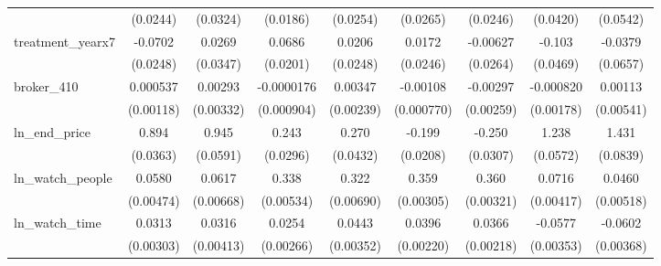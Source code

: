 {\begin{adjustbox}{max width=\textwidth}
\begin{tabular}{l*{8}{c}}
            &    (0.0244)         &    (0.0324)         &    (0.0186)         &    (0.0254)         &    (0.0265)         &    (0.0246)         &    (0.0420)         &    (0.0542)         \\
\addlinespace
treatment\_yearx7&     -0.0702\sym{***}&      0.0269         &      0.0686\sym{***}&      0.0206         &      0.0172         &    -0.00627         &      -0.103\sym{**} &     -0.0379         \\
            &    (0.0248)         &    (0.0347)         &    (0.0201)         &    (0.0248)         &    (0.0246)         &    (0.0264)         &    (0.0469)         &    (0.0657)         \\
\addlinespace
broker\_410  &    0.000537         &     0.00293         &  -0.0000176         &     0.00347         &    -0.00108         &    -0.00297         &   -0.000820         &     0.00113         \\
            &   (0.00118)         &   (0.00332)         &  (0.000904)         &   (0.00239)         &  (0.000770)         &   (0.00259)         &   (0.00178)         &   (0.00541)         \\
\addlinespace
ln\_end\_price&       0.894\sym{***}&       0.945\sym{***}&       0.243\sym{***}&       0.270\sym{***}&      -0.199\sym{***}&      -0.250\sym{***}&       1.238\sym{***}&       1.431\sym{***}\\
            &    (0.0363)         &    (0.0591)         &    (0.0296)         &    (0.0432)         &    (0.0208)         &    (0.0307)         &    (0.0572)         &    (0.0839)         \\
\addlinespace
ln\_watch\_people&      0.0580\sym{***}&      0.0617\sym{***}&       0.338\sym{***}&       0.322\sym{***}&       0.359\sym{***}&       0.360\sym{***}&      0.0716\sym{***}&      0.0460\sym{***}\\
            &   (0.00474)         &   (0.00668)         &   (0.00534)         &   (0.00690)         &   (0.00305)         &   (0.00321)         &   (0.00417)         &   (0.00518)         \\
\addlinespace
ln\_watch\_time&      0.0313\sym{***}&      0.0316\sym{***}&      0.0254\sym{***}&      0.0443\sym{***}&      0.0396\sym{***}&      0.0366\sym{***}&     -0.0577\sym{***}&     -0.0602\sym{***}\\
            &   (0.00303)         &   (0.00413)         &   (0.00266)         &   (0.00352)         &   (0.00220)         &   (0.00218)         &   (0.00353)         &   (0.00368)         \\

\end{tabular}
\end{adjustbox}}
